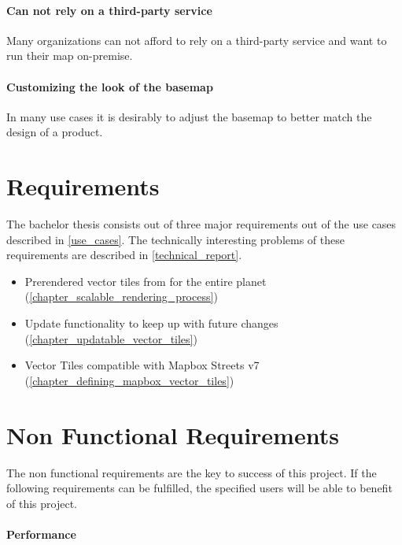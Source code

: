 \paragraph{Can not rely on a third-party service}

Many organizations can not afford to rely on a third-party service and want to run their map on-premise.

\paragraph{Customizing the look of the basemap}

In many use cases it is desirably to adjust the basemap to better match the design of a product.

\section{Requirements}\label{requirements}

The bachelor thesis consists out of three major requirements out of the use cases described in \autoref{use_cases}. The technically interesting problems of these requirements are described in \autoref{technical_report}.

\begin{itemize}
    \item Prerendered vector tiles from \osm{} for the entire planet (\autoref{chapter_scalable_rendering_process})
    \item Update functionality to keep up with future \osm{} changes (\autoref{chapter_updatable_vector_tiles})
    \item Vector Tiles compatible with Mapbox Streets v7 (\autoref{chapter_defining_mapbox_vector_tiles})
\end{itemize}


\section{Non Functional Requirements}\label{non_functional_requirements}

The non functional requirements are the key to success of this project. If the following requirements can be fulfilled, the specified users will be able to benefit of this project.

\paragraph{Performance}

